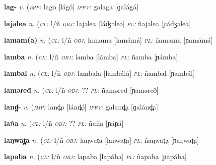 \newentry
\headword\textbf{lag-}  
\ipa{[lág-]}
\synpos\textit{v.} 
\imperative(\textit {\textsc{imp:}} lago [lágó]  
\imperfective\textit{\textsc{ipfv:}} galaga [ɡalágá]

\newentry
\headword\textbf{lajəlea} 
\ipa{[láʤəleə]}
\synpos\textit{n.} 
\class(\textit{\textsc{cl:}} {l/ñ}
\object\textit{\textsc{obj:}} lajəlea [láʤəleə]
\plural\textit{\textsc{pl:}} ñajəlea [ɲádʒəlea]

\newentry
\headword\textbf{lamam(a)} 
\ipa{[lamám(á)]}
\synpos\textit{n.} 
\class(\textit{\textsc{cl:}} {l/ñ}
\object\textit{\textsc{obj:}} lamama [lamámá]
\plural\textit{\textsc{pl:}} ñamama [ɲamámá]

\newentry
\headword\textbf{lamba} 
\ipa{[lámba]}
\synpos\textit{n.} 
\class(\textit{\textsc{cl:}} {l/ñ}
\object\textit{\textsc{obj:}} lamba [lámba]
\plural\textit{\textsc{pl:}} ñamba [ɲámba]

\newentry
\headword\textbf{lambal} 
\ipa{[lambál]}
\synpos\textit{n.} 
\class(\textit{\textsc{cl:}} {l/ñ}
\object\textit{\textsc{obj:}} lambala [lambálá]
\plural\textit{\textsc{pl:}} ñambal [ɲambál]

\newentry
\headword\textbf{laməɾeđ} 
\ipa{[laməɾeð]}
\synpos\textit{n.} 
\class(\textit{\textsc{cl:}} {l/ñ}
\object\textit{\textsc{obj:}} ??
\plural\textit{\textsc{pl:}} ñaməređ [ɲaməreð]


\newentry
\headword\textbf{land̪-}  
\ipa{[lánd̪-]}
\synpos\textit{v.} 
\imperative(\textit {\textsc{imp:}} land̪o [lánd̪ó]  
\imperfective\textit{\textsc{ipfv:}} galand̪a [ɡalánd̪a]

\newentry
\headword\textbf{laña} 
\ipa{[láɲá]}
\synpos\textit{n.} 
\class(\textit{\textsc{cl:}} {l/ñ}
\object\textit{\textsc{obj:}} ??
\plural\textit{\textsc{pl:}} ñaña [ɲáɲá]

\newentry
\headword\textbf{laŋwat̪a} 
\ipa{[laŋwat̪a]}
\synpos\textit{n.} 
\class(\textit{\textsc{cl:}} {l/ñ}
\object\textit{\textsc{obj:}} laŋwat̪a [laŋwat̪a]
\plural\textit{\textsc{pl:}} ñaŋwat̪a [ɲaŋwat̪a]

\newentry
\headword\textbf{lapaba} 
\ipa{[lapába]}
\synpos\textit{n.} 
\class(\textit{\textsc{cl:}} {l/ñ}
\object\textit{\textsc{obj:}} lapaba [lapába]
\plural\textit{\textsc{pl:}} ñapaba [ɲapába]

